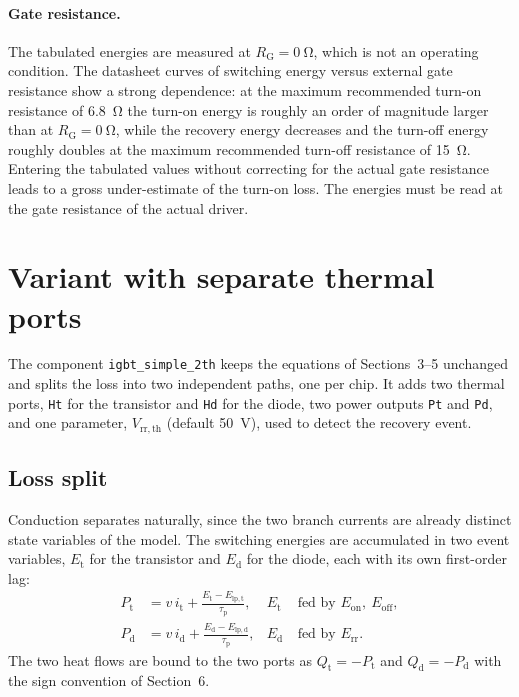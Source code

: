\documentclass[11pt,a4paper]{article}
\newcommand{\code}[1]{\texttt{\small #1}}
\begin{document}
\paragraph{Gate resistance.} The tabulated energies are measured at
$R_\mathrm{G} = \SI{0}{\ohm}$, which is not an operating condition. The
datasheet curves of switching energy versus external gate resistance show a
strong dependence: at the maximum recommended turn-on resistance of
\SI{6.8}{\ohm} the turn-on energy is roughly an order of magnitude larger than
at $R_\mathrm{G} = \SI{0}{\ohm}$, while the recovery energy decreases and the
turn-off energy roughly doubles at the maximum recommended turn-off resistance
of \SI{15}{\ohm}. Entering the tabulated values without correcting for the
actual gate resistance leads to a gross under-estimate of the turn-on loss. The
energies must be read at the gate resistance of the actual driver.

\section{Variant with separate thermal ports}
\label{sec:2th}

The component \code{igbt\_simple\_2th} keeps the equations of
Sections~3--5 unchanged and splits the loss into two independent paths, one per
chip. It adds two thermal ports, \code{Ht} for the transistor and \code{Hd} for
the diode, two power outputs \code{Pt} and \code{Pd}, and one parameter,
$V_\mathrm{rr,th}$ (default \SI{50}{\volt}), used to detect the recovery event.

\subsection{Loss split}

Conduction separates naturally, since the two branch currents are already
distinct state variables of the model. The switching energies are accumulated in
two event variables, $E_\mathrm{t}$ for the transistor and $E_\mathrm{d}$ for
the diode, each with its own first-order lag:
\begin{align}
  P_\mathrm{t} &= v\,i_\mathrm{t}
    + \frac{E_\mathrm{t} - E_\mathrm{lp,t}}{\tau_\mathrm{p}},
  & E_\mathrm{t} &\ \text{fed by } E_\mathrm{on},\ E_\mathrm{off},\\
  P_\mathrm{d} &= v\,i_\mathrm{d}
    + \frac{E_\mathrm{d} - E_\mathrm{lp,d}}{\tau_\mathrm{p}},
  & E_\mathrm{d} &\ \text{fed by } E_\mathrm{rr}.
\end{align}
The two heat flows are bound to the two ports as
$Q_\mathrm{t} = -P_\mathrm{t}$ and $Q_\mathrm{d} = -P_\mathrm{d}$ with the sign
convention of Section~6.
\end{document}
